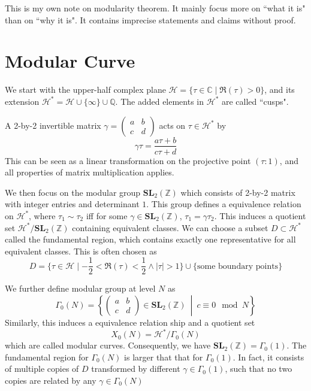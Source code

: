\documentclass[]{article}
\begin{document}
This is my own note on modularity theorem. It mainly focus more on ``what it is" than on ``why it is". It contains imprecise statements and claims without proof.

\section{Modular Curve}

We start with the upper-half complex plane $\mathcal{H} = \{\tau\in\mathbb{C}\mid\mathfrak{R}(\tau)>0\}$, and its extension $\mathcal{H}^* = \mathcal{H} \cup \{\infty\} \cup\mathbb{Q}$. The added elements in $\mathcal{H}^*$ are called ``cusps".

A 2-by-2 invertible matrix $\gamma = \left( \begin{matrix}
	a & b \\c& d
\end{matrix}\right)$ acts on $\tau\in\mathcal{H}^*$ by
\[
\gamma \tau = \frac{a\tau + b}{c\tau + d}
\]
This can be seen as a linear transformation on the projective point $(\tau:1)$, and all properties of matrix multiplication applies.

We then focus on the modular group $\mathbf{SL}_2(\mathbb{Z})$ which consists of 2-by-2 matrix with integer entries and determinant $1$. This group defines a equivalence relation on $\mathcal{H}^*$, where $\tau_1 \sim \tau_2$ iff for some $\gamma\in\mathbf{SL}_2(\mathbb{Z})$, $\tau_1 = \gamma\tau_2$. This induces a quotient set $\mathcal{H}^* / \mathbf{SL}_2(\mathbb{Z})$ containing equivalent classes. We can choose a subset $D \subset \mathcal{H}^*$ called the fundamental region, which contains exactly one representative for all equivalent classes. This is often chosen as
\[
D = \{\tau\in\mathcal{H} \mid -\frac{1}{2}<\mathfrak{R}(\tau)<\frac{1}{2} \land |\tau| > 1 \} \cup \{\mbox{some boundary points}\}
\]

We further define modular group at level $N$ as
\[
\Gamma_0(N) = \left\{ \left(\begin{matrix}
		a&b \\ c&d
	\end{matrix}\right) \in \mathbf{SL}_2(\mathbb{Z}) \ \middle|\ c\equiv0\mod N \right\}
\]
Similarly, this induces a equivalence relation ship and a quotient set
\[
X_0(N) = \mathcal{H}^* /\Gamma_0(N)
\]
which are called modular curves. Consequently, we have $\mathbf{SL}_2(\mathbb{Z}) = \Gamma_0(1)$. The fundamental region for $\Gamma_0(N)$ is larger that that for $\Gamma_0(1)$. In fact, it consists of multiple copies of $D$ transformed by different $\gamma \in \Gamma_0(1)$, such that no two copies are related by any $\gamma\in\Gamma_0(N)$
\end{document}
